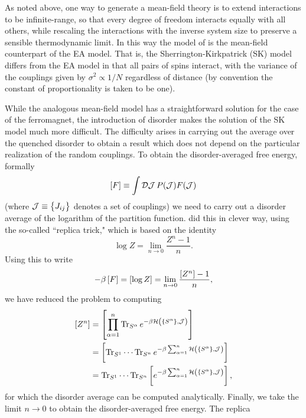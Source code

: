 As noted above, one way to generate a mean-field theory is to extend
interactions to be infinite-range, so that every degree of freedom interacts
equally with all others, while rescaling the interactions with the inverse
system size to preserve a sensible thermodynamic limit. In this way the model
of \textcite{sherrington1975solvable} is the mean-field counterpart of the EA
model. That is, the Sherrington-Kirkpatrick (SK) model differs from the EA
model in that all pairs of spins interact, with the variance of the couplings
given by $\sigma^2 \propto 1/N$ regardless of distance (by convention the
constant of proportionality is taken to be one).

While the analogous mean-field model has a straightforward solution for the
case of the ferromagnet, the introduction of disorder makes the solution of the
SK model much more difficult. The difficulty arises in carrying out the average
over the quenched disorder to obtain a result which does not depend on the
particular realization of the random couplings. To obtain the disorder-averaged
free energy, formally
\begin{equation}
  \left[F\right] \equiv \int \mathcal{D}\mathcal{J} \, P(\mathcal{J}) F(\mathcal{J})
\end{equation}
(where $\JJ \equiv \cbr{J_{ij}}$ denotes a set of couplings) we need to carry
out a disorder average of the logarithm of the partition function.
\textcite{sherrington1975solvable} did this in clever way, using the so-called
``replica trick," which is based on the identity
\begin{equation}
  \log Z = \lim_{n \to 0} \frac{Z^n-1}{n}.
\end{equation}
Using this to write
\begin{equation}
  -\beta \left[F\right]
  = \left[\log Z\right]
  = \lim_{n \to 0} \frac{\left[Z^n\right]-1}{n},
\end{equation}
we have reduced the problem to computing
\begin{align*}
  \davc{Z^n}
  &=\davc{\prod_{\alpha=1}^n \Tr_{S^{\alpha}}
    e^{-\beta\ham\del{\cbr{S^{\alpha}},\JJ}}} \\
  &=\davc{\Tr_{S^{1}} \cdots \Tr_{S^{n}}
    e^{-\beta\sum_{\alpha=1}^n
    \ham\del{\cbr{S^{\alpha}},\JJ}}} \\
  &=\Tr_{S^{1}} \cdots \Tr_{S^{n}}
    \davc{e^{-\beta\sum_{\alpha=1}^n
    \ham\del{\cbr{S^{\alpha}},\JJ}}},
\end{align*}
for which the disorder average can be computed analytically. Finally, we take
the limit $n \to 0$ to obtain the disorder-averaged free energy. The replica

